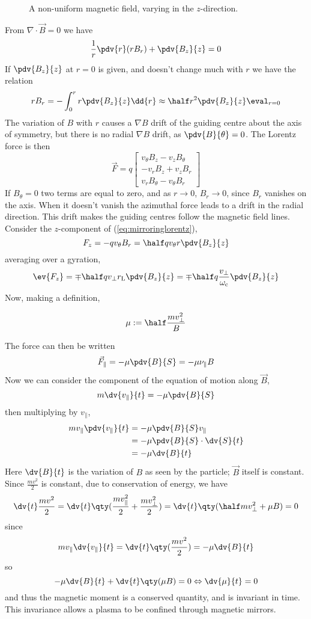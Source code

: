 \documentclass{book}         		                %
\begin{document}
\begin{figure}
  \centering
  
  \caption{A non-uniform magnetic field, varying in the $z$-direction.}
  \label{fig:magneticmirror1}
\end{figure}

From $\nabla \cdot \vec{B} = 0$ we have 
\[ \frac{1}{r} \pdv{r} (r B_r) + \pdv{B_z}{z} = 0 \] If $\pdv{B_z}{z}$
at $r=0$ is given, and doesn't change much with $r$ we have the
relation
\[ r B_r = - \int_0^r r \pdv{B_z}{z} \dd{r} \approx \half r^2
\pdv{B_z}{z} \eval_{r=0} \] The variation of $B$ with $r$ causes a
$\nabla B$ drift of the guiding centre about the axis of symmetry, but
there is no radial $\nabla B$ drift, as $\pdv{B}{\theta}=0$. The Lorentz force is then
\begin{equation}
  \label{eq:mirroringlorentz}
  \vec{F} = q
  \begin{bmatrix}
    v_{\theta} B_z - v_z B_{\theta} \\ - v_r B_z + v_z B_r \\ v_r B_{\theta} - v_{\theta} B_r
  \end{bmatrix}
\end{equation}
If $B_{\theta}=0$ two terms are equal to zero, and as $r \to 0$, $B_r
\to 0$, since $B_r$ vanishes on the axis. When it doesn't vanish the
azimuthal force leads to a drift in the radial direction. This drift
makes the guiding centres follow the magnetic field lines. Consider
the $z$-component of (\ref{eq:mirroringlorentz}),
\[ F_z = -q v_{\theta} B_r = \half q v_{\theta} r \pdv{B_z}{z} \]
averaging over a gyration,
\[ \ev{F_z} = \mp \half q v_{\perp} r_{\rm L} \pdv{B_z}{z} = \mp \half
q \frac{v_{\perp}}{\omega_{\rm c}} \pdv{B_z}{z} \]
Now, making a definition,
\begin{definition}
\[ \mu := \half \frac{m v_{\perp}^2}{B} \]  
\end{definition}
The force can then be written
\begin{equation}
  \label{eq:5}
  \vec{F}_{\parallel} = - \mu \pdv{B}{S} = - \mu \nu_{\parallel} B
\end{equation}
Now we can consider the component of the equation of motion along
$\vec{B}$, 
\[ m \dv{v_{\parallel}}{t} = - \mu \pdv{B}{S} \] then multiplying by
$v_{\parallel}$,
\begin{align*}
  m v_{\parallel} \pdv{v_{\parallel}}{t} &= - \mu \pdv{B}{S} v_{\parallel} \\ &= - \mu \pdv{B}{S} \cdot \dv{S}{t} \\ &= -\mu \dv{B}{t}
\end{align*}
Here $\dv{B}{t}$ is the variation of $B$ as seen by the particle;
$\vec{B}$ itself is constant. Since $\frac{mv^2}{2}$ is constant, due
to conservation of energy, we have
\[ \dv{t} \frac{mv^2}{2} = \dv{t} \qty( \frac{mv_{\parallel}^2}{2} +
\frac{m v_{\perp}^2}{2} ) = \dv{t} \qty( \half mv_{\perp}^2 + \mu
B)=0 \]
since 
\[ m v_{\parallel} \dv{v_{\parallel}}{t} = \dv{t} \qty( \frac{mv^2}{2} ) = - \mu \dv{B}{t} \]
so
\[ - \mu \dv{B}{t} + \dv{t} \qty( \mu B ) = 0 \Leftrightarrow
\dv{\mu}{t} = 0 \] and thus the magnetic moment is a conserved
quantity, and is invariant in time. This invariance allows a plasma to
be confined through magnetic mirrors.
\end{document}
